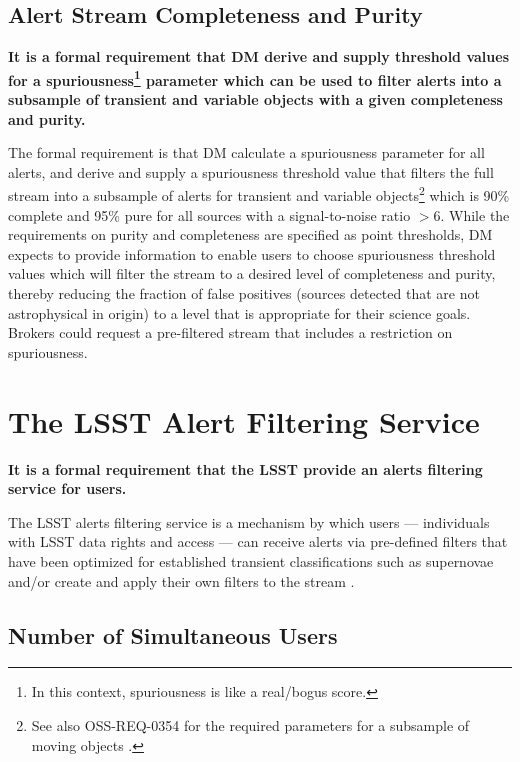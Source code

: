 \documentclass[DM,lsstdraft,authoryear,toc]{lsstdoc}
\begin{document}
\subsection{Alert Stream Completeness and Purity}\label{ssec:comp_pure}

{\bf It is a formal requirement that DM derive and supply threshold values for a spuriousness\footnote{In this context, spuriousness is like a real/bogus score.} parameter which can be used to filter alerts into a subsample of transient and variable objects with a given completeness and purity.}

The formal requirement is that DM calculate a spuriousness parameter for all alerts, and derive and supply a spuriousness threshold value that filters the full stream into a subsample of alerts for transient and variable objects\footnote{See also OSS-REQ-0354 for the required parameters for a subsample of moving objects .} which is 90\% complete and 95\% pure for all sources with a signal-to-noise ratio $>$6. While the requirements on purity and completeness are specified as point thresholds, DM expects to provide information to enable users to choose spuriousness threshold values which will filter the stream to a desired level of completeness and purity, thereby reducing the fraction of false positives (sources detected that are not astrophysical in origin) to a level that is appropriate for their science goals. Brokers could request a pre-filtered stream that includes a restriction on spuriousness.


\section{The LSST Alert Filtering Service} \label{sec:LAFS}

{\bf It is a formal requirement that the LSST provide an alerts filtering service for users.} 

The LSST alerts filtering service is a mechanism by which users --- individuals with LSST data rights and access --- can receive alerts via pre-defined filters that have been optimized for established transient classifications such as supernovae and/or create and apply their own filters to the stream . 


\subsection{Number of Simultaneous Users}\label{ssec:LAFS_users}
\end{document}
